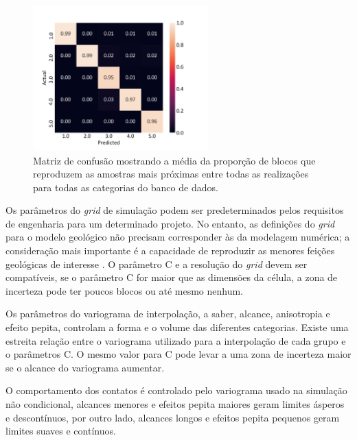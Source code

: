 \begin{figure}[H]
	\caption{\label{fig:backflag_bound_hier} Matriz de confusão mostrando a média da proporção de blocos que reproduzem as amostras mais próximas entre todas as realizações para todas as categorias do banco de dados.}
	\centering
		\includegraphics[width=0.6\textwidth]{capitulo_3/imagens/backflag_bound_hier.png}
\end{figure}

Os parâmetros do \textit{grid} de simulação podem ser predeterminados pelos requisitos de engenharia para um determinado projeto. No entanto, as definições do \textit{grid} para o modelo geológico não precisam corresponder às da modelagem numérica; a consideração mais importante é a capacidade de reproduzir as menores feições geológicas de interesse \cite{martin}. O parâmetro C e a resolução do \textit{grid} devem ser compatíveis, se o parâmetro C for maior que as dimensões da célula, a zona de incerteza pode ter poucos blocos ou até mesmo nenhum.

Os parâmetros do variograma de interpolação, a saber, alcance, anisotropia e efeito pepita, controlam a forma e o volume das diferentes categorias. Existe uma estreita relação entre o variograma utilizado para a interpolação de cada grupo e o parâmetros C. O mesmo valor para C pode levar a uma zona de incerteza maior se o alcance do variograma aumentar.

O comportamento dos contatos é controlado pelo variograma usado na simulação não condicional, alcances menores e efeitos pepita maiores geram limites ásperos e descontínuos, por outro lado, alcances longos e efeitos pepita pequenos geram limites suaves e contínuos.

